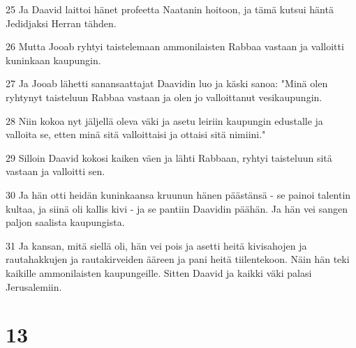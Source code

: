 \par 25 Ja Daavid laittoi hänet profeetta Naatanin hoitoon, ja tämä kutsui häntä Jedidjaksi Herran tähden.
\par 26 Mutta Jooab ryhtyi taistelemaan ammonilaisten Rabbaa vastaan ja valloitti kuninkaan kaupungin.
\par 27 Ja Jooab lähetti sanansaattajat Daavidin luo ja käski sanoa: "Minä olen ryhtynyt taisteluun Rabbaa vastaan ja olen jo valloittanut vesikaupungin.
\par 28 Niin kokoa nyt jäljellä oleva väki ja asetu leiriin kaupungin edustalle ja valloita se, etten minä sitä valloittaisi ja ottaisi sitä nimiini."
\par 29 Silloin Daavid kokosi kaiken väen ja lähti Rabbaan, ryhtyi taisteluun sitä vastaan ja valloitti sen.
\par 30 Ja hän otti heidän kuninkaansa kruunun hänen päästänsä - se painoi talentin kultaa, ja siinä oli kallis kivi - ja se pantiin Daavidin päähän. Ja hän vei sangen paljon saalista kaupungista.
\par 31 Ja kansan, mitä siellä oli, hän vei pois ja asetti heitä kivisahojen ja rautahakkujen ja rautakirveiden ääreen ja pani heitä tiilentekoon. Näin hän teki kaikille ammonilaisten kaupungeille. Sitten Daavid ja kaikki väki palasi Jerusalemiin.

\chapter{13}

